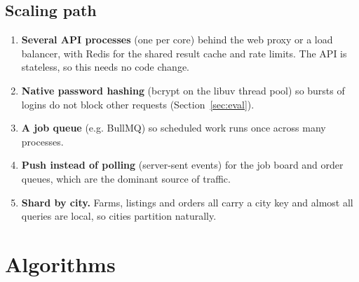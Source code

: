 \documentclass[11pt,a4paper]{article}
\begin{document}
\subsection{Scaling path}

\begin{enumerate}
  \item \textbf{Several API processes} (one per core) behind the web proxy or a load balancer, with Redis for the shared result cache and rate limits. The API is stateless, so this needs no code change.
  \item \textbf{Native password hashing} (bcrypt on the libuv thread pool) so bursts of logins do not block other requests (Section~\ref{sec:eval}).
  \item \textbf{A job queue} (e.g. BullMQ) so scheduled work runs once across many processes.
  \item \textbf{Push instead of polling} (server-sent events) for the job board and order queues, which are the dominant source of traffic.
  \item \textbf{Shard by city.} Farms, listings and orders all carry a city key and almost all queries are local, so cities partition naturally.
\end{enumerate}

\section{Algorithms}\label{sec:algo}
\end{document}
